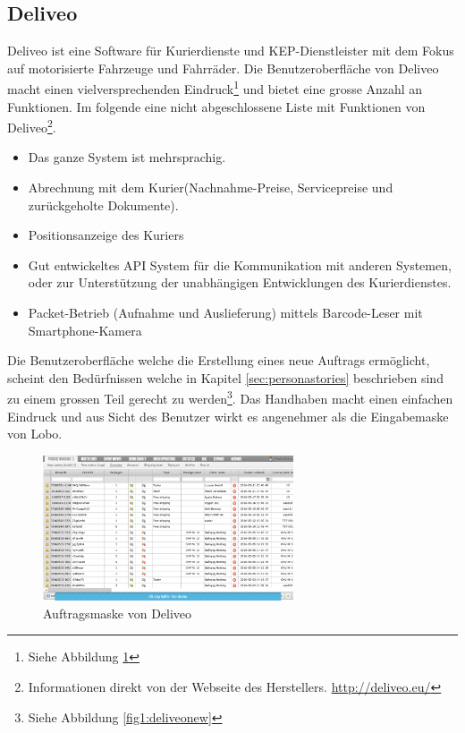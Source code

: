\subsection{Deliveo}
Deliveo ist eine Software für Kurierdienste und KEP-Dienstleister mit dem Fokus auf motorisierte Fahrzeuge und Fahrräder. Die Benutzeroberfläche von Deliveo macht einen vielversprechenden Eindruck\footnote{ Siehe Abbildung \ref{fig1:deliveomask}} und bietet eine grosse Anzahl an Funktionen. Im folgende eine nicht abgeschlossene Liste mit Funktionen von Deliveo\footnote{ Informationen direkt von der Webseite des Herstellers. \url{http://deliveo.eu/}}.
\begin{itemize}
	\item Das ganze System ist mehrsprachig.
	\item Abrechnung mit dem Kurier(Nachnahme-Preise, Servicepreise und zurückgeholte Dokumente).
	\item Positionsanzeige des Kuriers
	\item Gut entwickeltes API System für die Kommunikation mit anderen Systemen, oder zur Unterstützung der unabhängigen Entwicklungen des Kurierdienstes.
	\item Packet-Betrieb (Aufnahme und Auslieferung) mittels Barcode-Leser mit Smartphone-Kamera
\end{itemize}
Die Benutzeroberfläche welche die Erstellung eines neue Auftrags ermöglicht, scheint den Bedürfnissen welche in Kapitel \ref{sec:personastories} beschrieben sind zu einem grossen Teil gerecht zu werden\footnote{ Siehe Abbildung \ref{fig1:deliveonew}}. Das Handhaben macht einen einfachen Eindruck und aus Sicht des Benutzer wirkt es angenehmer als die Eingabemaske von Lobo.

\begin{figure}[ht]
	\centering
  \includegraphics[width=0.66\textwidth]{images/deliveo.png}
	\caption{Auftragsmaske von Deliveo}
	\label{fig1:deliveomask}
\end{figure}

